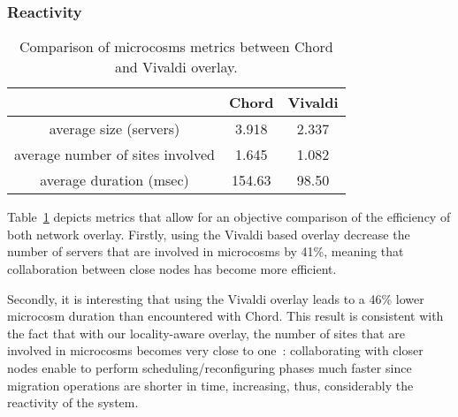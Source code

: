 \subsubsection{Reactivity}
\begin{table}[t!]

  \begin{center}
    \begin{tabular}{|c|c|c|}   

      \hline \multicolumn{1}{|p{3cm}|}{ }
       & \multicolumn{1}{|p{3cm}|}{\centering Chord }  & \multicolumn{1}{|p{3cm}|}{ \centering Vivaldi}  \\

      \hline
      average size (servers) & 3.918 & 2.337 \\

      \hline
      average number of sites involved & 1.645 & 1.082 \\

      \hline
      average duration (msec) & 154.63 & 98.50 \\

      \hline
    \end{tabular}
  \end{center}
  \caption{\label{microcosm_table} Comparison of microcosms metrics between Chord and Vivaldi overlay.}
\end{table}


Table~\ref{microcosm_table} depicts metrics that allow for an objective comparison of the
efficiency of both network overlay. Firstly, using the Vivaldi based overlay decrease the
number of servers that are involved in microcosms by 41\%, meaning that collaboration
between close nodes has become more efficient.

Secondly, it is interesting that using the Vivaldi overlay leads to a 46\% lower
microcosm duration than encountered with Chord. This result is consistent with 
the fact that with our locality-aware overlay, the number of sites that are involved in microcosms
becomes very close to one~: collaborating with closer nodes enable
to perform scheduling/reconfiguring phases much faster since migration operations are shorter in time, increasing, thus, considerably the reactivity of the system.

% 
